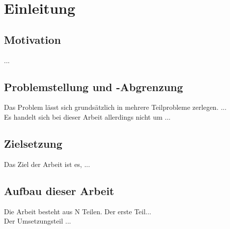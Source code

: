 
\chapter{Einleitung} %

\section{Motivation} %
...


\section{Problemstellung und -Abgrenzung} %
Das Problem lässt sich grundsätzlich in mehrere Teilprobleme zerlegen. ...\\
Es handelt sich bei dieser Arbeit allerdings nicht um ...


\section{Zielsetzung} %
Das Ziel der Arbeit ist es, ...


\section{Aufbau dieser Arbeit} %
Die Arbeit besteht aus N Teilen. Der erste Teil...\\

Der Umsetzungsteil ...
